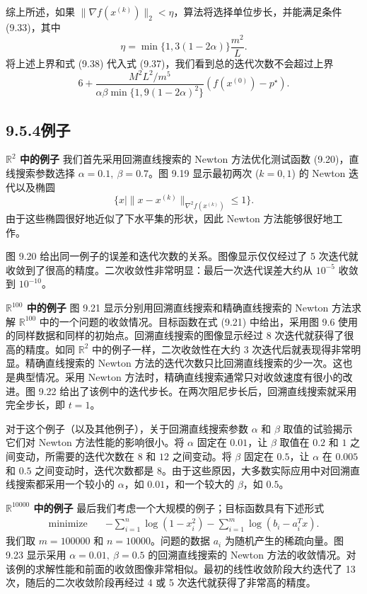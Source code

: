 \documentclass[UTF8, 12pt, fontset=fandol, oneside]{ctexart}
\begin{document}
综上所述，如果 $\|\nabla f(x^{(k)})\|_2<\eta$，算法将选择单位步长，并能满足条件 (9.33)，其中
\[
\eta=\min\{1,3(1-2\alpha)\}\frac{m^2}{L}.
\]
将上述上界和式 (9.38) 代入式 (9.37)，我们看到总的迭代次数不会超过上界
\begin{equation}
6+\frac{M^2L^2/m^5}{\alpha\beta\min\{1,9(1-2\alpha)^2\}}(f(x^{(0)})-p^\star).
\tag{9.40}
\end{equation}

\subsection*{9.5.4\quad 例子}

\noindent\textbf{$\mathbb{R}^2$ 中的例子}\quad
我们首先采用回溯直线搜索的 Newton 方法优化测试函数 (9.20)，直线搜索参数选择 $\alpha=0.1,\ \beta=0.7$。图 9.19 显示最初两次 ($k=0,1$) 的 Newton 迭代以及椭圆
\[
\{x\mid \|x-x^{(k)}\|_{\nabla^2f(x^{(k)})}\leq1\}.
\]
由于这些椭圆很好地近似了下水平集的形状，因此 Newton 方法能够很好地工作。

图 9.20 给出同一例子的误差和迭代次数的关系。图像显示仅仅经过了 5 次迭代就收敛到了很高的精度。二次收敛性非常明显：最后一次迭代误差大约从 $10^{-5}$ 收敛到 $10^{-10}$。

\noindent\textbf{$\mathbb{R}^{100}$ 中的例子}\quad
图 9.21 显示分别用回溯直线搜索和精确直线搜索的 Newton 方法求解 $\mathbb{R}^{100}$ 中的一个问题的收敛情况。目标函数在式 (9.21) 中给出，采用图 9.6 使用的同样数据和同样的初始点。回溯直线搜索的图像显示经过 8 次迭代就获得了很高的精度。如同 $\mathbb{R}^2$ 中的例子一样，二次收敛性在大约 3 次迭代后就表现得非常明显。精确直线搜索的 Newton 方法的迭代次数只比回溯直线搜索的少一次。这也是典型情况。采用 Newton 方法时，精确直线搜索通常只对收敛速度有很小的改进。图 9.22 给出了该例中的迭代步长。在两次阻尼步长后，回溯直线搜索就采用完全步长，即 $t=1$。

对于这个例子（以及其他例子），关于回溯直线搜索参数 $\alpha$ 和 $\beta$ 取值的试验揭示它们对 Newton 方法性能的影响很小。将 $\alpha$ 固定在 $0.01$，让 $\beta$ 取值在 $0.2$ 和 $1$ 之间变动，所需要的迭代次数在 $8$ 和 $12$ 之间变动。将 $\beta$ 固定在 $0.5$，让 $\alpha$ 在 $0.005$ 和 $0.5$ 之间变动时，迭代次数都是 $8$。由于这些原因，大多数实际应用中对回溯直线搜索都采用一个较小的 $\alpha$，如 $0.01$，和一个较大的 $\beta$，如 $0.5$。

\noindent\textbf{$\mathbb{R}^{10000}$ 中的例子}\quad
最后我们考虑一个大规模的例子；目标函数具有下述形式
\[
\begin{aligned}
\text{minimize}\quad & -\sum_{i=1}^n\log(1-x_i^2)-\sum_{i=1}^m\log(b_i-a_i^Tx).
\end{aligned}
\]
我们取 $m=100000$ 和 $n=10000$。问题的数据 $a_i$ 为随机产生的稀疏向量。图 9.23 显示采用 $\alpha=0.01,\ \beta=0.5$ 的回溯直线搜索的 Newton 方法的收敛情况。对该例的求解性能和前面的收敛图像非常相似。最初的线性收敛阶段大约迭代了 13 次，随后的二次收敛阶段再经过 4 或 5 次迭代就获得了非常高的精度。
\end{document}
